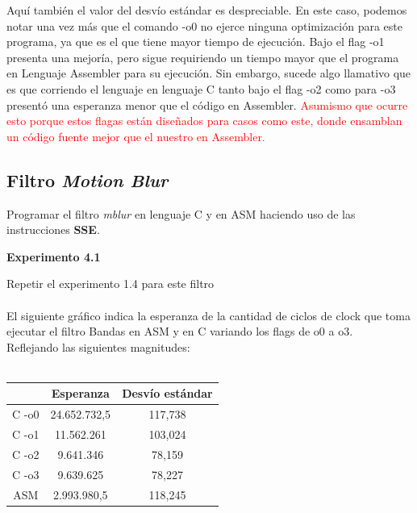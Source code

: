 Aqu\'i tambi\'en el valor del desv\'io est\'andar es despreciable. En este caso, podemos notar una vez m\'as que el comando -o0 no ejerce ninguna optimizaci\'on para este programa, ya que es el que tiene mayor tiempo de ejecuci\'on. Bajo el flag -o1 presenta una mejor\'ia, pero sigue requiriendo un tiempo mayor que el programa en Lenguaje Assembler para su ejecuci\'on. Sin embargo, sucede algo llamativo que es que corriendo el lenguaje en lenguaje C tanto bajo el flag -o2 como para -o3 present\'o una esperanza menor que el c\'odigo en Assembler. \textcolor{red}{Asumismo que ocurre esto porque estos flagas est\'an dise\~nados para casos como este, donde ensamblan un c\'odigo fuente mejor que el nuestro en Assembler.}


\newpage
\subsection{Filtro \textit{Motion Blur}}
Programar el filtro \textit{mblur} en lenguaje C y en ASM haciendo uso de 
las instrucciones \textbf{SSE}.

\vspace*{0.3cm} \noindent
\textbf{Experimento 4.1}

Repetir el experimento 1.4 para este filtro \\
\\
El siguiente gr\'afico indica la esperanza de la cantidad de ciclos de clock que toma ejecutar el filtro Bandas en ASM y en C variando los flags de o0 a o3. \\
Reflejando las siguientes magnitudes: \\
\\
 \begin{tabular}[c]{|c|c|c|}
	\hline
		 & Esperanza & Desv\'io est\'andar\\
		\hline
C -o0 & 24.652.732,5 & 117,738 \\
\hline
C -o1 & 11.562.261 & 103,024  \\
\hline
C -o2 & 9.641.346 & 78,159  \\
\hline
C -o3 & 9.639.625 & 78,227 \\
\hline
ASM & 2.993.980,5 & 118,245 \\
\hline
	\end{tabular}\\\\
\\

